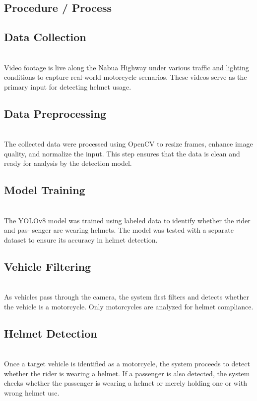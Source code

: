 \begin{refsection}
\section*{Procedure / Process}


\subsection{Data Collection} \\
Video footage is live along the Nabua Highway under various traffic and lighting conditions to capture real-world motorcycle scenarios. These videos serve as the primary input for detecting helmet usage.

\subsection {Data Preprocessing} \\
The collected data were processed using OpenCV to resize frames, enhance image quality, and normalize the input. This step ensures that the data is clean and ready for analysis by the detection model.

\subsection {Model Training} \\
The YOLOv8 model was trained using labeled data to identify whether the rider and pas- senger are wearing helmets. The model was tested with a separate dataset to ensure its accuracy in helmet detection.

\subsection {Vehicle Filtering} \\
As vehicles pass through the camera, the system first filters and detects whether the vehicle is a motorcycle. Only motorcycles are analyzed for helmet compliance.

\subsection {Helmet Detection} \\
Once a target vehicle is identified as a motorcycle, the system proceeds to detect whether the rider is wearing a helmet. If a passenger is also detected, the system checks whether the passenger is wearing a helmet or merely holding one or with wrong helmet use.


\end{refsection}
